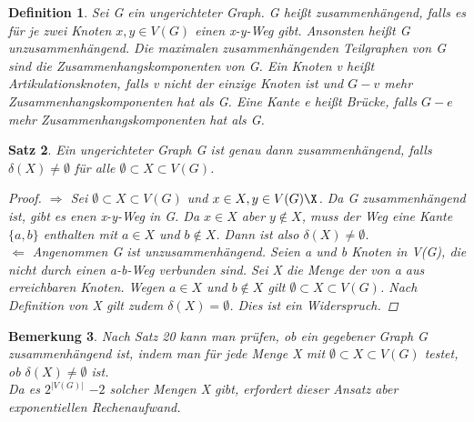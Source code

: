 \documentclass{beamer}
\newtheorem{satz}{Satz}
\newtheorem{bemerkung}[satz]{Bemerkung}
\newtheorem{defi}[satz]{Definition}
\begin{document}
 \begin{frame}
  \vfill
    \begin{center}
      \begin{defi}
        Sei G ein ungerichteter Graph.
        G heißt zusammenhängend, falls es für je zwei Knoten $x,y \in V(G)$ einen x-y-Weg gibt.
        Ansonsten heißt G unzusammenhängend.
        Die maximalen zusammenhängenden Teilgraphen von G sind die Zusammenhangskomponenten von G.
        Ein Knoten v heißt Artikulationsknoten, falls v nicht der einzige Knoten ist und $G-v$ mehr Zusammenhangskomponenten hat als G.
        Eine Kante e heißt Brücke, falls $G-e$ mehr Zusammenhangskomponenten hat als G.
      \end{defi}
    \end{center}
  \vfill
  \end{frame}

  \begin{frame}
  \vfill
    \begin{center}
      \begin{satz}
        Ein ungerichteter Graph G ist genau dann zusammenhängend, falls $\delta (X)\neq \emptyset$ für alle $\emptyset \subset X\subset V(G)$.
        \begin {proof}
          $\Rightarrow$ Sei  $\emptyset \subset X\subset V(G)$ und $x\in X, y\in V(G)\X$. 
          Da G zusammenhängend ist, gibt es enen x-y-Weg in G.
          Da $x\in X$ aber $y\notin X$, muss der Weg eine Kante $\{a,b\}$ enthalten mit $a\in X$ und $b\notin X$.
          Dann ist also $\delta (X)\neq \emptyset$.\\
          $\Leftarrow$ Angenommen G ist unzusammenhängend. Seien a und b Knoten in V(G), die nicht durch einen a-b-Weg verbunden sind.
          Sei X die Menge der von a aus erreichbaren Knoten.
         Wegen $a\in X$ und $b\notin X$ gilt $\emptyset \subset X\subset V(G)$.
         Nach Definition von X gilt zudem $\delta (X)= \emptyset$.
         Dies ist ein Widerspruch.
        \end {proof}
      \end{satz}
    \end{center}
  \vfill
  \end{frame}

  \begin{frame}
  \vfill
    \begin{center}
      \begin{bemerkung} 
        Nach Satz 20 kann man prüfen, ob ein gegebener Graph G zusammenhängend ist, indem man für jede Menge X mit $\emptyset \subset X\subset V(G)$ testet, ob $\delta(X) \neq \emptyset$ ist.\\
        Da es  $2^{|V(G)|}$ $-2$ solcher Mengen X gibt, erfordert dieser Ansatz aber exponentiellen Rechenaufwand. 
      \end {bemerkung}
    \end{center}
  \vfill
  \end{frame}
\end{document}

